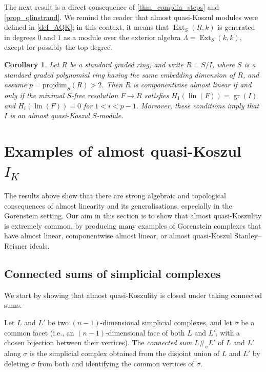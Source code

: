 \documentclass[a4paper,10pt]{amsart}
\newtheorem{corollary}[theorem]{Corollary}
\theoremstyle{definition}
\theoremstyle{remark}
\DeclareMathOperator{\gr}{gr}
\DeclareMathOperator{\lin}{lin}
\newcommand{\pd}{\mathrm{projdim}}
\DeclareMathOperator{\Ext}{Ext}
\begin{document}
The next result is a direct consequence of \cref{thm_complin_steps} and \cref{prop_qlinstrand}. We remind the reader that almost quasi-Koszul modules were defined in \cref{def_AQK}; in this context, it means that $\Ext_S(R,k)$ is generated in degrees $0$ and $1$ as a module over the exterior algebra $\Lambda=\Ext_S(k,k)$, except for possibly the top degree.

\begin{corollary} \label{cor_cal_aqk}
        Let $R$ be a standard graded ring, and write $R=S/I$, where $S$ is a standard graded polynomial ring having the same embedding dimension of $R$, and assume $p=\pd_S(R)>2$. Then $R$ is componentwise almost linear if and only if the minimal $S$-free resolution $F\to R$ satisfies $H_1(\lin(F))= \gr(I)$ and  $H_i(\lin(F))=0$ for $1<i<p-1$. Moreover, these conditions imply that $I$ is an almost quasi-Koszul $S$-module.
\end{corollary}



\section{Examples of almost quasi-Koszul \texorpdfstring{$I_K$}{IK}} \label{sec_examples}

The results above show that there are strong algebraic and topological consequences of almost linearity and its generalisations, especially in the Gorenstein setting. Our aim in this section is to show that almost quasi-Koszulity is extremely common, by producing many examples of Gorenstein complexes that have almost linear, componentwise almost linear, or almost quasi-Koszul Stanley--Reisner ideals.


\subsection*{Connected sums of simplicial complexes} We start by showing that almost quasi-Koszulity is closed under taking connected sums.

Let $L$ and $L'$ be two $(n-1)$-dimensional simplicial complexes, and let $\sigma$ be a common facet (i.e., an $(n-1)$-dimensional face of both $L$ and $L'$, with a chosen bijection between their vertices). The \emph{connected sum} $L\#_\sigma L'$ of $L$ and $L'$ along $\sigma$ is the simplicial complex obtained from the disjoint union of $L$ and $L'$ by deleting $\sigma$ from both and identifying the common vertices of $\sigma$.
\end{document}
